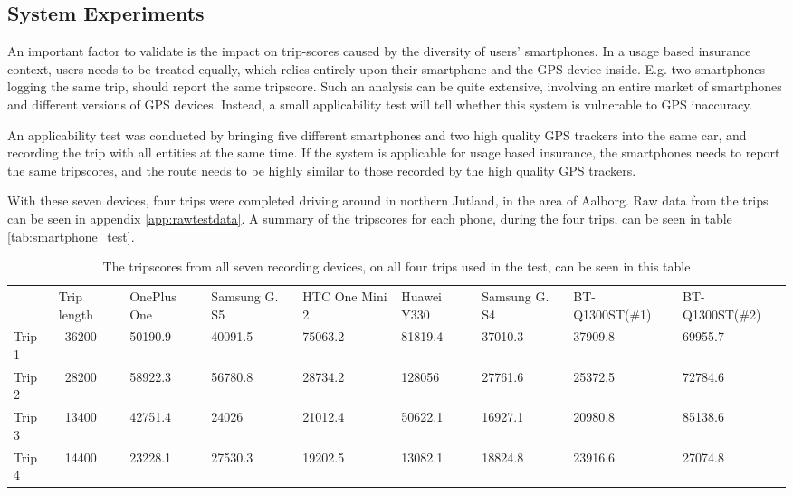 \subsection{System Experiments}\label{subsec:expsystem}
An important factor to validate is the impact on trip-scores caused by the diversity of users' smartphones. In a usage based insurance context, users needs to be treated equally, which relies entirely upon their smartphone and the GPS device inside. E.g. two smartphones logging the same trip, should report the same tripscore. Such an analysis can be quite extensive, involving an entire market of smartphones and different versions of GPS devices. Instead, a small applicability test will tell whether this system is vulnerable to GPS inaccuracy. 

An applicability test was conducted by bringing five different smartphones and two high quality GPS trackers into the same car, and recording the trip with all entities at the same time. If the system is applicable for usage based insurance, the smartphones needs to report the same tripscores, and the route needs to be highly similar to those recorded by the high quality GPS trackers. 

With these seven devices, four trips were completed driving around in northern Jutland, in the area of Aalborg. Raw data from the trips can be seen in appendix \ref{app:rawtestdata}. A summary of the tripscores for each phone, during the four trips, can be seen in table \ref{tab:smartphone_test}.

\begin{table*}[tb]
\centering
\caption{The tripscores from all seven recording devices, on all four trips used in the test, can be seen in this table}
\label{tab:smartphone_test_one}
\begin{tabular}{lllllllll}
       & Trip length & OnePlus One & Samsung G. S5 & HTC One Mini 2 & Huawei Y330 & Samsung G. S4 & BT-Q1300ST(\#1) & BT-Q1300ST(\#2) \\
Trip 1 & ~36200 & 50190.9     & 40091.5       & 75063.2        & 81819.4 & 37010.3       & 37909.8         & 69955.7         \\
Trip 2 & ~28200 & 58922.3     & 56780.8       & 28734.2        & 128056  & 27761.6       & 25372.5         & 72784.6         \\
Trip 3 & ~13400 & 42751.4     & 24026         & 21012.4        & 50622.1 & 16927.1       & 20980.8         & 85138.6         \\
Trip 4 & ~14400 & 23228.1     & 27530.3       & 19202.5        & 13082.1 & 18824.8       & 23916.6         & 27074.8        
\end{tabular}
\end{table*}

